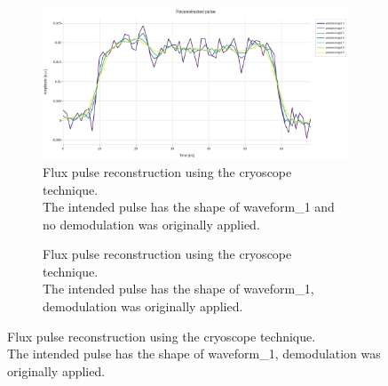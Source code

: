 \begin{figure}[h!]
    \centering
    \begin{subfigure}[t]{0.45\textwidth}
        \includegraphics[width=\textwidth]{figures/png/Cryoscope/no_demod/amplitude_windows.png}
        \caption{Flux pulse reconstruction using the cryoscope technique.\\
        The intended pulse has the shape of waveform\_1 and no demodulation was originally applied.}
        \label{fig:amplitude:step_dem}
    \end{subfigure}
    \hfill
    \begin{subfigure}[t]{0.45\textwidth}
        \caption{Flux pulse reconstruction using the cryoscope technique.\\
        The intended pulse has the shape of waveform\_1, demodulation was originally applied.}
        \label{fig:amplitude:step_no_dem}
    \end{subfigure}

    \vspace{0.5cm}


\end{figure}
